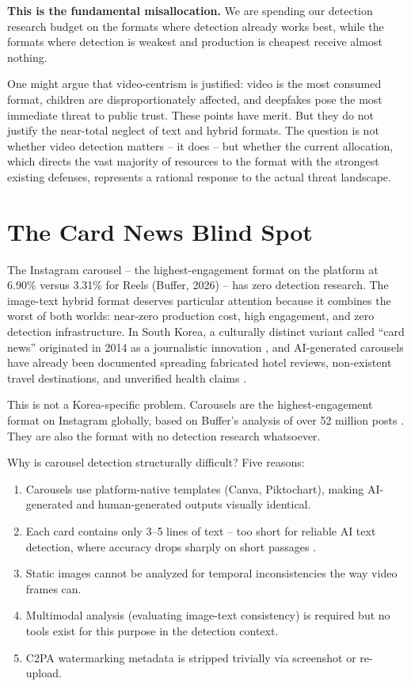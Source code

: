 \documentclass[12pt]{article}
\begin{document}
\textbf{This is the fundamental misallocation.} We are spending our detection research budget on the formats where detection already works best, while the formats where detection is weakest and production is cheapest receive almost nothing.

One might argue that video-centrism is justified: video is the most consumed format, children are disproportionately affected, and deepfakes pose the most immediate threat to public trust. These points have merit. But they do not justify the near-total neglect of text and hybrid formats. The question is not whether video detection matters -- it does -- but whether the current allocation, which directs the vast majority of resources to the format with the strongest existing defenses, represents a rational response to the actual threat landscape.

\section{The Card News Blind Spot}

The Instagram carousel -- the highest-engagement format on the platform at 6.90\% versus 3.31\% for Reels (Buffer, 2026) \cite{buffer2026} -- has zero detection research. The image-text hybrid format deserves particular attention because it combines the worst of both worlds: near-zero production cost, high engagement, and zero detection infrastructure. In South Korea, a culturally distinct variant called ``card news'' originated in 2014 as a journalistic innovation \cite{cardnews2018}, and AI-generated carousels have already been documented spreading fabricated hotel reviews, non-existent travel destinations, and unverified health claims \cite{jackreview2026}.

This is not a Korea-specific problem. Carousels are the highest-engagement format on Instagram globally, based on Buffer's analysis of over 52 million posts \cite{buffer2026}. They are also the format with no detection research whatsoever.

Why is carousel detection structurally difficult? Five reasons:
\begin{enumerate}[leftmargin=*]
    \item Carousels use platform-native templates (Canva, Piktochart), making AI-generated and human-generated outputs visually identical.
    \item Each card contains only 3--5 lines of text -- too short for reliable AI text detection, where accuracy drops sharply on short passages \cite{shaib2025}.
    \item Static images cannot be analyzed for temporal inconsistencies the way video frames can.
    \item Multimodal analysis (evaluating image-text consistency) is required but no tools exist for this purpose in the detection context.
    \item C2PA watermarking metadata is stripped trivially via screenshot or re-upload.
\end{enumerate}
\end{document}
